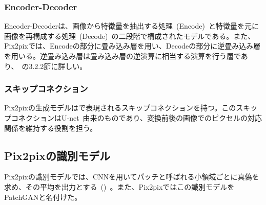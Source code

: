 \subsubsection{Encoder-Decoder}

Encoder-Decoderは、画像から特徴量を抽出する処理~(Encode)~と特徴量を元に画像を再構成する処理~(Decode)~の二段階で構成されたモデルである。また、Pix2pixでは、Encodeの部分に畳み込み層を用い、Decodeの部分に逆畳み込み層を用いる。逆畳み込み層は畳み込み層の逆演算に相当する演算を行う層であり、~\cite{Deconv}の3.2.2節に詳しい。

\subsubsection{スキップコネクション}

Pix2pixの生成モデルはで表現されるスキップコネクションを持つ。このスキップコネクションはU-net~\cite{u-net}由来のものであり、変換前後の画像でのピクセルの対応関係を維持する役割を担う。

\subsection{Pix2pixの識別モデル}

Pix2pixの識別モデルでは、CNNを用いてパッチと呼ばれる小領域ごとに真偽を求め、その平均を出力とする~()~。また、Pix2pixではこの識別モデルをPatchGANと名付けた。

